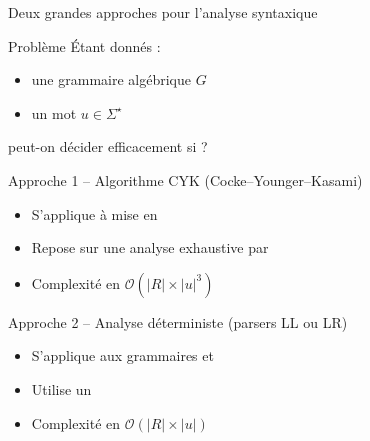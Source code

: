 
\begingroup

\begin{frame}{Deux grandes approches pour l'analyse syntaxique}

  \begin{alertblock}{Problème}
    Étant donnés :
    \begin{itemize}
      \item une grammaire algébrique $G$
      \item un mot $u \in \Sigma^\star$
    \end{itemize}
    peut-on décider efficacement si  ?
  \end{alertblock}

  \begin{block}{Approche 1 -- Algorithme CYK (Cocke–Younger–Kasami)}
    \begin{itemize}
      \item S'applique à  mise en %
      \item Repose sur une analyse exhaustive par 
      \item Complexité en $\mathcal{O}(|R| \times |u|^3)$
    \end{itemize}
  \end{block}

  \begin{block}{Approche 2 -- Analyse déterministe (parsers LL ou LR)}
    \begin{itemize}
      \item S'applique aux grammaires  et 
      \item Utilise un 
      \item Complexité en $\mathcal{O}(|R| \times |u|)$
    \end{itemize}
  \end{block}

\end{frame}

\endgroup

